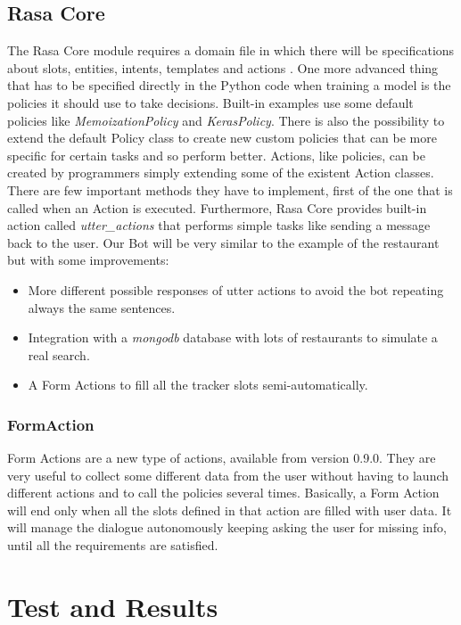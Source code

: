 \documentclass[11pt,a4paper]{article}
\begin{document}
\subsection{Rasa Core}

The Rasa Core module requires a domain file in which there will be specifications about slots, entities, intents, templates and actions \cite{rasa_core}. One more advanced thing that has to be specified directly in the Python code when training a model is the policies it should use to take decisions. Built-in examples use some default policies like \textit{MemoizationPolicy} and \textit{KerasPolicy}. There is also the possibility to extend the default Policy class to create new custom policies that can be more specific for certain tasks and so perform better.
Actions, like policies, can be created by programmers simply extending some of the existent Action classes. There are few important methods they have to implement, first of the one that is called when an Action is executed. Furthermore, Rasa Core provides built-in action called \textit{utter\_actions} that performs simple tasks like sending a message back to the user.
Our Bot will be very similar to the example of the restaurant but with some improvements:
\begin{itemize}
\item More different possible responses of utter actions to avoid the bot repeating always the same sentences.
\item Integration with a \textit{mongodb} database with lots of restaurants to simulate a real search.
\item A Form Actions to fill all the tracker slots semi-automatically.
\end{itemize}

\subsubsection{FormAction}
Form Actions are a new type of actions, available from version 0.9.0. They are very useful to collect some different data from the user without having to launch different actions and to call the policies several times. Basically, a Form Action will end only when all the slots defined in that action are filled with user data. It will manage the dialogue autonomously keeping asking the user for missing info, until all the requirements are satisfied.

\section{Test and Results}
\end{document}
